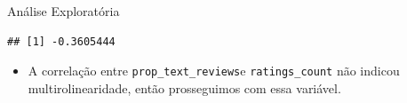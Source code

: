 \documentclass[
  9 pt,
  ignorenonframetext,
]{beamer}
\newenvironment{Shaded}{\begin{snugshade}}{\end{snugshade}}
\newcommand{\AttributeTok}[1]{\textcolor[rgb]{0.77,0.63,0.00}{#1}}
\newcommand{\FunctionTok}[1]{\textcolor[rgb]{0.00,0.00,0.00}{#1}}
\newcommand{\NormalTok}[1]{#1}
\newcommand{\SpecialCharTok}[1]{\textcolor[rgb]{0.00,0.00,0.00}{#1}}
\newcommand{\StringTok}[1]{\textcolor[rgb]{0.31,0.60,0.02}{#1}}
\providecommand{\tightlist}{%
  \setlength{\itemsep}{0pt}\setlength{\parskip}{0pt}}
\begin{document}
\begin{frame}[fragile]{Análise Exploratória}
\begin{Shaded}
\end{Shaded}

\begin{verbatim}
## [1] -0.3605444
\end{verbatim}

\begin{itemize}
\tightlist
\item
  A correlação entre \texttt{prop\_text\_reviews}e
  \texttt{ratings\_count} não indicou multirolinearidade, então
  prosseguimos com essa variável.
\end{itemize}
\end{frame}
\end{document}
